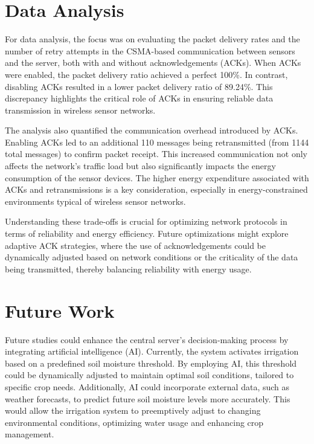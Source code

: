 \documentclass[12pt]{article}
\begin{document}
\section{Data Analysis}\label{sec:data}
For data analysis, the focus was on evaluating the packet delivery rates and the number of retry attempts in the CSMA-based communication between sensors and the server, both with and without acknowledgements (ACKs). When ACKs were enabled, the packet delivery ratio achieved a perfect 100\%. In contrast, disabling ACKs resulted in a lower packet delivery ratio of 89.24\%. This discrepancy highlights the critical role of ACKs in ensuring reliable data transmission in wireless sensor networks.

The analysis also quantified the communication overhead introduced by ACKs. Enabling ACKs led to an additional 110 messages being retransmitted (from 1144 total messages) to confirm packet receipt. This increased communication not only affects the network's traffic load but also significantly impacts the energy consumption of the sensor devices. The higher energy expenditure associated with ACKs and retransmissions is a key consideration, especially in energy-constrained environments typical of wireless sensor networks.

Understanding these trade-offs is crucial for optimizing network protocols in terms of reliability and energy efficiency. Future optimizations might explore adaptive ACK strategies, where the use of acknowledgements could be dynamically adjusted based on network conditions or the criticality of the data being transmitted, thereby balancing reliability with energy usage.


\section{Future Work}\label{sec:future}
Future studies could enhance the central server's decision-making process by integrating artificial intelligence (AI). Currently, the system activates irrigation based on a predefined soil moisture threshold. By employing AI, this threshold could be dynamically adjusted to maintain optimal soil conditions, tailored to specific crop needs. Additionally, AI could incorporate external data, such as weather forecasts, to predict future soil moisture levels more accurately. This would allow the irrigation system to preemptively adjust to changing environmental conditions, optimizing water usage and enhancing crop management.
\end{document}
